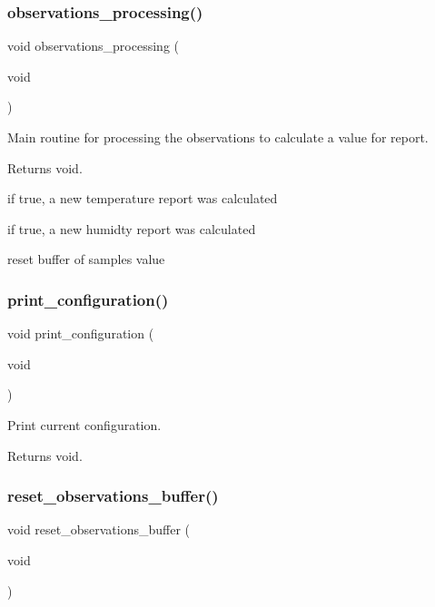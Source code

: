\subsubsection{\texorpdfstring{observations\+\_\+processing()}{observations\_processing()}}
{\footnotesize\ttfamily void observations\+\_\+processing (\begin{DoxyParamCaption}\item[{void}]{ }\end{DoxyParamCaption})}



Main routine for processing the observations to calculate a value for report. 

\begin{DoxyReturn}{Returns}
void. 
\end{DoxyReturn}
if true, a new temperature report was calculated

if true, a new humidty report was calculated

reset buffer of samples value \mbox{\label{i2c-th_8ino_a65b2dadc0411e43874ec8ed7f73bc62a}} 
\subsubsection{\texorpdfstring{print\+\_\+configuration()}{print\_configuration()}}
{\footnotesize\ttfamily void print\+\_\+configuration (\begin{DoxyParamCaption}\item[{void}]{ }\end{DoxyParamCaption})}



Print current configuration. 

\begin{DoxyReturn}{Returns}
void. 
\end{DoxyReturn}
\mbox{\label{i2c-th_8ino_adfc6b4ac31f79cb1c99dd2409f05f32d}} 
\subsubsection{\texorpdfstring{reset\+\_\+observations\+\_\+buffer()}{reset\_observations\_buffer()}}
{\footnotesize\ttfamily void reset\+\_\+observations\+\_\+buffer (\begin{DoxyParamCaption}\item[{void}]{ }\end{DoxyParamCaption})}



